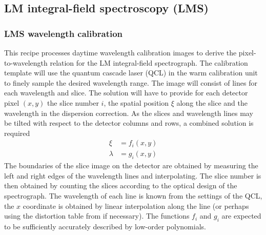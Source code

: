 
\clearpage
\subsection{LM integral-field spectroscopy (LMS)}
\label{ssec:LMS_recipes}


\subsubsection{LMS wavelength calibration}
\label{sssec:lms_wavecal}

This recipe processes daytime wavelength calibration images to derive
the pixel-to-wavelength relation for the LM integral-field
spectrograph. The calibration template will use the quantum cascade
laser (QCL) in the warm calibration unit to finely sample the desired
wavelength range. The image will consist of lines for each wavelength
and slice. The solution will have to provide for each detector pixel
$(x,y)$ the slice number $i$, the spatial position $\xi$ along the
slice and the wavelength in the dispersion correction. As the slices
and wavelength lines may be tilted with respect to the detector
columns and rows, a combined solution is required
\begin{eqnarray}
  \label{eq:wavelength_solution}
  \xi &= f_{i}(x, y) \\
  \lambda &= g_{i}(x, y)
\end{eqnarray}
The boundaries of the slice image on the detector are obtained by
measuring the left and right edges of the wavelength lines and
interpolating. The slice number is then obtained by counting the
slices according to the optical design of the spectrograph. The
wavelength of each line is known from the settings of the QCL, the $x$
coordinate is obtained by linear interpolation along the line (or
perhaps using the distortion table from  if
necessary). The functions $f_{i}$ and $g_{i}$ are expected to be
sufficiently accurately described by low-order polynomials.

